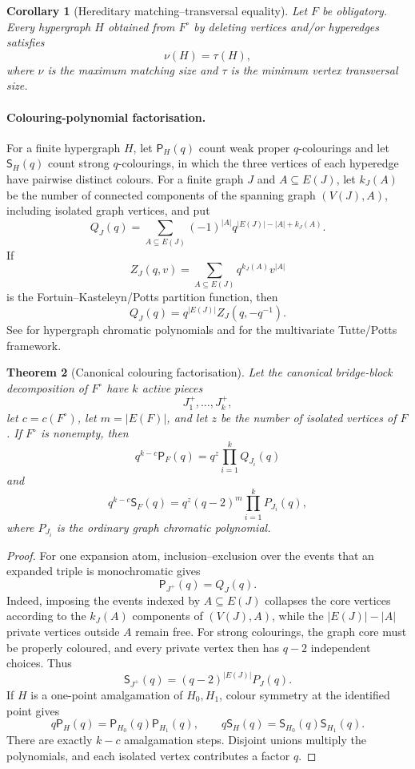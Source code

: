 \documentclass[a4paper,11pt,reqno]{amsart}
\theoremstyle{plain}
\newtheorem{theorem}{Theorem}[section]
\newtheorem{corollary}[theorem]{Corollary}
\theoremstyle{definition}
\theoremstyle{remark}
\begin{document}
\begin{corollary}[Hereditary matching--transversal equality]\label{corollary-10.9-balanced-konig}
Let $F$ be obligatory.  Every hypergraph $H$ obtained from $F^\circ$ by
deleting vertices and/or hyperedges satisfies
\[
\nu(H)=\tau(H),
\tag{10.12}
\]
where $\nu$ is the maximum matching size and $\tau$ is the minimum vertex
transversal size.
\end{corollary}

\paragraph{Colouring-polynomial factorisation.}
For a finite hypergraph $H$, let $\mathsf P_H(q)$ count weak proper
$q$-colourings and let $\mathsf S_H(q)$ count strong $q$-colourings, in which
the three vertices of each hyperedge have pairwise distinct colours.  For a
finite graph $J$ and $A\subseteq E(J)$, let $k_J(A)$ be the number of connected
components of the spanning graph $(V(J),A)$, including isolated graph
vertices, and put
\[
Q_J(q)=\sum_{A\subseteq E(J)}
(-1)^{|A|}q^{|E(J)|-|A|+k_J(A)}.
\tag{10.13}
\]
If
\[
Z_J(q,v)=\sum_{A\subseteq E(J)}q^{k_J(A)}v^{|A|}
\]
is the Fortuin--Kasteleyn/Potts partition function, then
\[
Q_J(q)=q^{|E(J)|}Z_J(q,-q^{-1}).
\tag{10.14}
\]
See \citet{white2011} for hypergraph chromatic polynomials and
\citet{sokal2005} for the multivariate Tutte/Potts framework.

\begin{theorem}[Canonical colouring factorisation]\label{theorem-10.10-colouring-factorisation}
Let the canonical bridge-block decomposition of $F^\circ$ have $k$ active
pieces
\[
J_1^+,\ldots,J_k^+,
\]
let $c=c(F^\circ)$, let $m=|E(F)|$, and let $z$ be the number of isolated
vertices of $F$.  If $F^\circ$ is nonempty, then
\[
\boxed{
q^{k-c}\mathsf P_F(q)=q^z\prod_{i=1}^k Q_{J_i}(q)
}
\tag{10.15}
\]
and
\[
\boxed{
q^{k-c}\mathsf S_F(q)
=q^z(q-2)^m\prod_{i=1}^k P_{J_i}(q),
}
\tag{10.16}
\]
where $P_{J_i}$ is the ordinary graph chromatic polynomial.
\end{theorem}

\begin{proof}
For one expansion atom, inclusion--exclusion over the events that an expanded
triple is monochromatic gives
\[
\mathsf P_{J^+}(q)=Q_J(q).
\]
Indeed, imposing the events indexed by $A\subseteq E(J)$ collapses the core
vertices according to the $k_J(A)$ components of $(V(J),A)$, while the
$|E(J)|-|A|$ private vertices outside $A$ remain free.  For strong colourings,
the graph core must be properly coloured, and every private vertex then has
$q-2$ independent choices.  Thus
\[
\mathsf S_{J^+}(q)=(q-2)^{|E(J)|}P_J(q).
\]
If $H$ is a one-point amalgamation of $H_0,H_1$, colour symmetry at the
identified point gives
\[
q\mathsf P_H(q)=\mathsf P_{H_0}(q)\mathsf P_{H_1}(q),
\qquad
q\mathsf S_H(q)=\mathsf S_{H_0}(q)\mathsf S_{H_1}(q).
\]
There are exactly $k-c$ amalgamation steps.  Disjoint unions multiply the
polynomials, and each isolated vertex contributes a factor $q$.
\end{proof}
\end{document}
